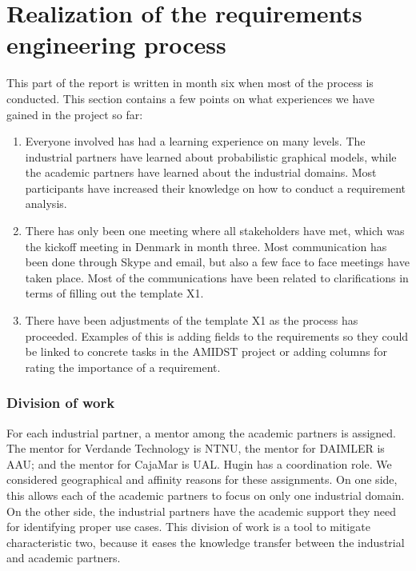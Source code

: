 
\section{Realization of the requirements engineering process}
\label{sec:realization}

This part of the report is written in month six when most of the process is conducted.  This section contains a few points on what experiences we have gained in the project so far:

\begin{enumerate}
\item Everyone involved has had a learning experience on many levels.  The industrial partners have learned about probabilistic graphical models, while the academic partners have learned about the industrial domains.  Most participants have increased their knowledge on how to conduct a requirement analysis. 
\item There has only been one meeting where all stakeholders have met, which was the kickoff meeting in Denmark in month three.  Most communication has been done through Skype and email, but also a few face to face meetings have taken place. Most of the communications have been related to clarifications in terms of filling out the template X1.
\item There have been adjustments of the template X1 as the process has proceeded.  Examples of this is adding fields to the requirements so they could be linked to concrete tasks in the AMIDST project or adding columns for rating the importance of a requirement.
\end{enumerate}



\subsubsection*{Division of work}

For each industrial partner, a mentor among the academic partners is assigned. The mentor for Verdande Technology is NTNU, the mentor for DAIMLER is AAU; and the mentor for CajaMar is UAL. Hugin has a coordination role. We considered geographical and affinity reasons for these assignments.  On one side, this allows each of the academic partners to focus on only one industrial domain.  On the other side, the industrial partners have the academic support they need for identifying proper use cases.  This division of work is a tool to mitigate characteristic two, because it eases the knowledge transfer between the industrial and academic partners. 


